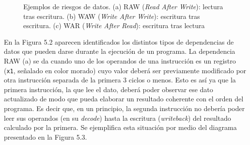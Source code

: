 \begin{figure}[ht]
\centering

\setlength{\fboxsep}{10pt}
\setlength{\fboxrule}{1pt}


\caption{Ejemplos de riesgos de datos. (a) RAW (\textit{Read After Write}): lectura tras escritura. (b) WAW (\textit{Write After Write}): escritura tras escritura. (c) WAR (\textit{Write After Read}): escritura tras lectura}
\label{fig:dependencias_riscv}

\end{figure}

En la Figura 5.2 aparecen identificados los distintos tipos de dependencias de datos que pueden darse durante la ejecución de un programa. La dependencia RAW (a) se da cuando uno de los operandos de una instrucción es un registro (\texttt{x1}, señalado en color morado) cuyo valor deberá ser previamente modificado por otra instrucción separada de la primera 3 ciclos o menos. Esto es así ya que la primera instrucción, la que lee el dato, deberá poder observar ese dato actualizado de modo que pueda elaborar un resultado coherente con el orden del programa. Es decir que, en un principio, la segunda instrucción no debería poder leer sus operandos (en su \textit{decode}) hasta la escritura (\textit{writeback}) del resultado calculado por la primera. Se ejemplifica esta situación por medio del diagrama presentado en la Figura 5.3.

